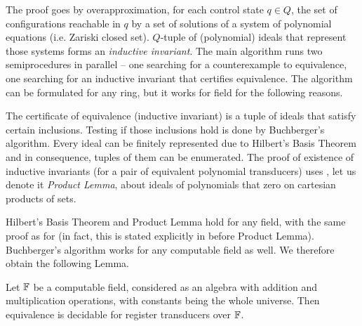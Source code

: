 The proof goes by overapproximation, for each control state $q \in Q$, the set of configurations reachable in $q$ by a set of solutions of a system of polynomial equations (i.e. Zariski closed set).
$Q$-tuple of (polynomial) ideals that represent those systems forms an \emph{inductive invariant}.
The main algorithm runs two semiprocedures in parallel -- one searching for a counterexample to equivalence, one searching for an inductive invariant that certifies equivalence. The algorithm can be formulated for any ring, %
but it works for field \Q for the following reasons.

The certificate of equivalence (inductive invariant) is a tuple of ideals that satisfy certain inclusions. Testing if those inclusions hold is done by Buchberger's algorithm. Every ideal can be finitely represented due to Hilbert's Basis Theorem and in consequence, tuples of them can be enumerated.
The proof of existence of inductive invariants (for a pair of equivalent polynomial transducers) uses \cite[Lemma 6.3]{seidlManethKemper2018}, let us denote it \emph{Product Lemma}, about ideals of polynomials that zero on cartesian products of sets.

 Hilbert's Basis Theorem and Product Lemma hold for any field, with the same proof as for \Q (in fact, this is stated explicitly in \cite{seidlManethKemper2018} before Product Lemma). Buchberger's algorithm works for any computable field as well. We therefore obtain the following Lemma.

\begin{lemma}\label{lem:equivalence-for-computable-field}
Let $\mathbb F$ be a computable field, considered as an algebra with addition and multiplication operations, with constants being the whole universe. Then equivalence is decidable for register transducers over $\mathbb F$.
\end{lemma}

